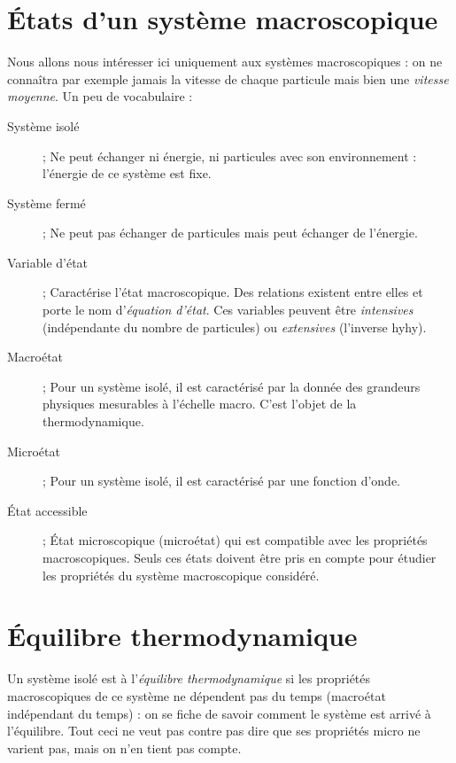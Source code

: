 \documentclass	[11pt, a4paper, openany]{book}
\begin{document}
\section{États d'un système macroscopique}
Nous allons nous intéresser ici uniquement aux systèmes macroscopiques : on ne connaîtra par exemple 
jamais la vitesse de chaque particule mais bien une \textit{vitesse moyenne}. Un peu de vocabulaire :
\begin{description}
\item[Système isolé] ; Ne peut échanger ni énergie, ni particules avec son environnement : l'énergie 
de ce système est fixe.
\item[Système fermé] ; Ne peut pas échanger de particules mais peut échanger de l'énergie.
\item[Variable d'état] ; Caractérise l'état macroscopique. Des relations existent entre elles et 
porte le nom d'\textit{équation d'état}. Ces variables peuvent être \textit{intensives} (indépendante 
du nombre de particules) ou \textit{extensives} (l'inverse hyhy).
\item[Macroétat] ; Pour un système isolé, il est caractérisé par la donnée des grandeurs physiques 
mesurables à l'échelle macro. C'est l'objet de la thermodynamique.
\item[Microétat] ; Pour un système isolé, il est caractérisé par une fonction d'onde.
\item[État accessible] ; État microscopique (microétat) qui est compatible avec les propriétés 
macroscopiques. Seuls ces états doivent être pris en compte pour étudier les propriétés du système
macroscopique considéré.
\end{description}


\section{Équilibre thermodynamique}
Un système isolé est à l'\textit{équilibre thermodynamique} si les propriétés macroscopiques de ce 
système ne dépendent pas du temps (macroétat indépendant du temps) : on se fiche de savoir comment le
système est arrivé à l'équilibre. Tout ceci ne veut pas contre pas dire que ses propriétés micro ne 
varient pas, mais on n'en tient pas compte.
\end{document}
